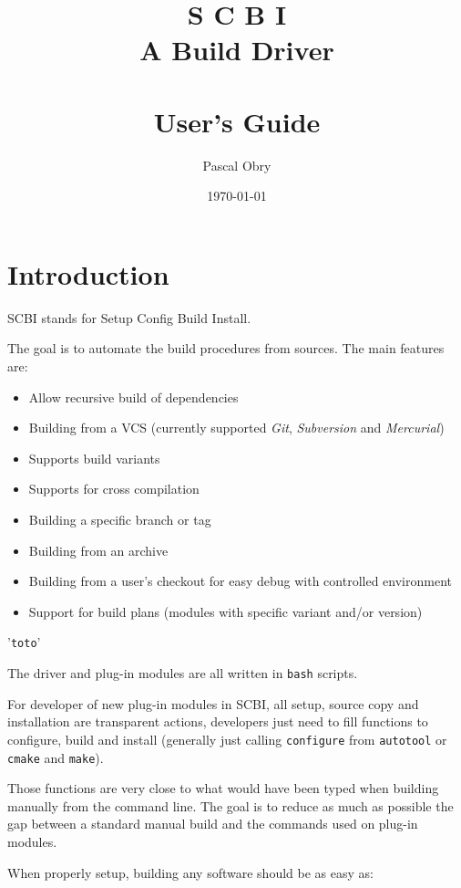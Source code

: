 \documentclass[a4paper,12pt,twoside]{article}
\title{{\Huge S C B I} \\
	{\large  A Build Driver \version} \\
	\hfill \\
	User's Guide}
\author{Pascal Obry}
\date{\today}
\newcommand{\code}[1]{\texttt{#1}}
\renewcommand{\emph}[1]{\textit{#1}}
\newcommand{\file}[1]{'{\texttt{#1}}'}
\let\stdsection\section
\renewcommand\section{\newpage\stdsection}
\begin{document}
\maketitle

%

\tableofcontents


\section{Introduction}

SCBI stands for Setup Config Build Install.

The goal is to automate the build procedures from sources. The main features are:

\begin{itemize}
	\item Allow recursive build of dependencies
	\item Building from a VCS (currently supported \emph{Git}, \emph{Subversion} and \emph{Mercurial})
	\item Supports build variants
	\item Supports for cross compilation
	\item Building a specific branch or tag
	\item Building from an archive
	\item Building from a user's checkout for easy debug with controlled environment
	\item Support for build plans (modules with specific variant and/or version)
\end{itemize}

\file{toto}

The driver and plug-in modules are all written in \code{bash} scripts.

For developer of new plug-in modules in SCBI, all setup, source copy and installation are transparent actions, developers just need to fill functions to configure, build and install (generally just calling \code{configure} from \code{autotool} or \code{cmake} and \code{make}).

Those functions are very close to what would have been typed when building manually from the command line. The goal is to reduce as much as possible the gap between a standard manual build and the commands used on plug-in modules.

When properly setup, building any software should be as easy as:
\end{document}
